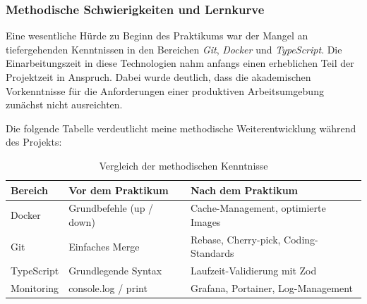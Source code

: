 \documentclass[12pt,a4paper]{report}
\begin{document}
    \subsubsection{Methodische Schwierigkeiten und Lernkurve} Eine wesentliche Hürde zu Beginn des Praktikums war der Mangel an tiefergehenden Kenntnissen in den Bereichen \textit{Git}, \textit{Docker} und \textit{TypeScript}. Die Einarbeitungszeit in diese Technologien nahm anfangs einen erheblichen Teil der Projektzeit in Anspruch. Dabei wurde deutlich, dass die akademischen Vorkenntnisse für die Anforderungen einer produktiven Arbeitsumgebung zunächst nicht ausreichten.

    Die folgende Tabelle verdeutlicht meine methodische Weiterentwicklung während des Projekts:

\begin{table}[h]
\centering
\renewcommand{\arraystretch}{1.5} %
\begin{tabular}{|l|l|l|}
\hline
\textbf{Bereich} & \textbf{Vor dem Praktikum} & \textbf{Nach dem Praktikum} \\ \hline
Docker & Grundbefehle (up / down) & Cache-Management, optimierte Images \\ \hline
Git & Einfaches Merge & Rebase, Cherry-pick, Coding-Standards \\ \hline
TypeScript & Grundlegende Syntax & Laufzeit-Validierung mit Zod \\ \hline
Monitoring & console.log / print & Grafana, Portainer, Log-Management \\ \hline
\end{tabular}
\caption{Vergleich der methodischen Kenntnisse}
\end{table}
\end{document}
